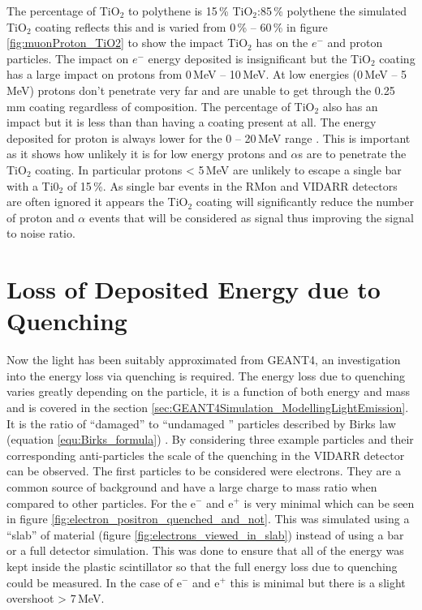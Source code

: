 
The percentage of TiO$_2$ to polythene is 15\,\% TiO$_2$:85\,\% polythene \cite{aliaga2014design} \cite{Pla-Dalmau2014} the simulated TiO$_2$ coating reflects this and is varied from 0\,\% -- 60\,\% in figure \ref{fig:muonProton_TiO2} to show the impact TiO$_2$ has on the $e^-$ and proton particles. The impact on $e^-$ energy deposited is insignificant but the TiO$_2$ coating has a large impact on protons from 0\,MeV -- 10\,MeV. At low energies (0\,MeV -- 5\,MeV) protons don't penetrate very far and are unable to get through the 0.25\,mm coating regardless of composition. The percentage of TiO$_2$ also has an impact but it is less than than having a coating present at all. The energy deposited for proton is always lower for the 0 -- 20\,MeV range . This is important as it shows how unlikely it is for low energy protons and $\alpha$s are to penetrate the TiO$_2$ coating. In particular protons < 5\,MeV are unlikely to escape a single bar with a Ti0$_2$ of 15\,\%. As single bar events in the RMon and VIDARR detectors are often ignored it appears the TiO$_2$ coating will significantly reduce the number of proton and $\alpha$ events that will be considered as signal thus improving the signal to noise ratio. 

\section{Loss of Deposited Energy due to Quenching}\label{sec:GEANT4Simulation_quenchingLoss}
Now the light has been suitably approximated from GEANT4, an investigation into the energy loss via quenching is required. The energy loss due to quenching varies greatly depending on the particle, it is a function of both energy and mass and is covered in the section \ref{sec:GEANT4Simulation_ModellingLightEmission}. It is the ratio of ``damaged'' to ``undamaged '' particles \cite{craun_1970} described by Birks law (equation \ref{equ:Birks_formula}) \cite{knoll_2010}. By considering three example particles and their corresponding anti-particles the scale of the quenching in the VIDARR detector can be observed. The first particles to be considered were electrons. They are a common source of background and have a large charge to mass ratio when compared to other particles. For the e$^-$ and e$^+$ is very minimal which can be seen in figure \ref{fig:electron_positron_quenched_and_not}. This was simulated using a ``slab'' of material (figure \ref{fig:electrons_viewed_in_slab}) instead of using a bar or a full detector simulation. This was done to ensure that all of the energy was kept inside the plastic scintillator so that the full energy loss due to quenching could be measured. In the case of e$^-$ and e$^+$ this is minimal but there is a slight overshoot > 7\,MeV. 

